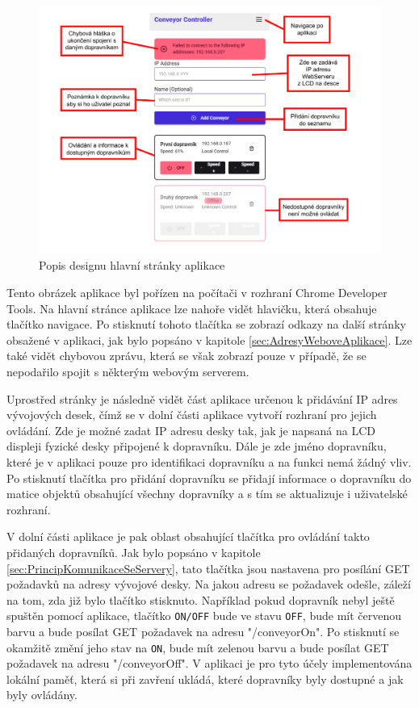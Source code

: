 \begin{figure}[H]
	\centering
	\includegraphics[width=1\linewidth]{images/LandingPage_Annot.drawio.pdf}
	\caption{Popis designu hlavní stránky aplikace}
	\label{fig:LandingPageAnnotated}
\end{figure}

Tento obrázek aplikace byl pořízen na počítači v rozhraní Chrome Developer Tools. Na hlavní stránce aplikace lze nahoře vidět hlavičku, která obsahuje tlačítko navigace. Po stisknutí tohoto tlačítka se zobrazí odkazy na další stránky obsažené v aplikaci, jak bylo popsáno v kapitole \ref{sec:AdresyWeboveAplikace}. Lze také vidět chybovou zprávu, která se však zobrazí pouze v případě, že se nepodařilo spojit s některým webovým serverem.

Uprostřed stránky je následně vidět část aplikace určenou k přidávání IP adres vývojových desek, čímž se v dolní části aplikace vytvoří rozhraní pro jejich ovládání. Zde je možné zadat IP adresu desky tak, jak je napsaná na LCD displeji fyzické desky připojené k dopravníku. Dále je zde jméno dopravníku, které je v aplikaci pouze pro identifikaci dopravníku a na funkci nemá žádný vliv. Po stisknutí tlačítka pro přidání dopravníku se přidají informace o dopravníku do matice objektů obsahující všechny dopravníky a s tím se aktualizuje i uživatelské rozhraní.

V dolní části aplikace je pak oblast obsahující tlačítka pro ovládání takto přidaných dopravníků. Jak bylo popsáno v kapitole \ref{sec:PrincipKomunikaceSeServery}, tato tlačítka jsou nastavena pro posílání GET požadavků na adresy vývojové desky. Na jakou adresu se požadavek odešle, záleží na tom, zda již bylo tlačítko stisknuto. Například pokud dopravník nebyl ještě spuštěn pomocí aplikace, tlačítko \texttt{ON/OFF} bude ve stavu \texttt{OFF}, bude mít červenou barvu a bude posílat GET požadavek na adresu "/conveyorOn". Po stisknutí se okamžitě změní jeho stav na \texttt{ON}, bude mít zelenou barvu a bude posílat GET požadavek na adresu "/conveyorOff". V aplikaci je pro tyto účely implementována lokální paměť, která si při zavření ukládá, které dopravníky byly dostupné a jak byly ovládány.

